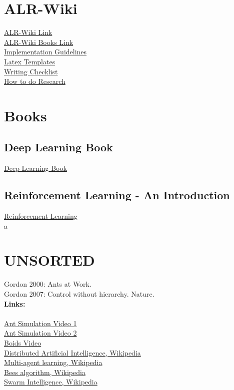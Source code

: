 \section{ALR-Wiki}
\href{https://www.notion.so/ALR-Student-Wiki-284ed2bb033f4ef494e2429ce0f51b6c}{ALR-Wiki Link}
\\
\href{https://www.notion.so/Books-e1b1a91cf80c426da3eddd9fec5bdd38}{ALR-Wiki Books Link}
\\
\href{https://www.notion.so/Implementation-Guidelines-0afdb8f58c714f42b3526eb415194c8c}{Implementation Guidelines}
\\
\href{https://www.notion.so/ebd32c68f9cd4502a02af10e82e410cd?v=0eab511a5007451baa2c199f0d6c7d35}{Latex Templates}
\\
\href{https://www.notion.so/Writing-Checklist-56979e6a0227447f8638d30bcbc33362}{Writing Checklist}
\\
\href{https://www.notion.so/Talks-How-to-research-e9b534f4dc09418e82cac8d8e2da4f4d}{How to do Research}

\section{Books}
\subsection{Deep Learning Book}
\href{https://www.deeplearningbook.org/}{Deep Learning Book}
\\


\subsection{Reinforcement Learning - An Introduction} 
\href{http://incompleteideas.net/book/the-book.html}{Reinforcement Learning}
\\
a

\section{UNSORTED}
Gordon 2000: Ants at Work.
\\
Gordon 2007: Control without hierarchy. Nature.
\\\textbf{Links:}\\
\\
\href{https://www.youtube.com/watch?v=X-iSQQgOd1A}{Ant Simulation Video 1}
\\
\href{https://www.youtube.com/watch?v=81GQNPJip2Y}{Ant Simulation Video 2}
\\
\href{https://www.youtube.com/watch?v=bqtqltqcQhw}{Boids Video}
\\
\href{https://en.wikipedia.org/wiki/Distributed_artificial_intelligence}{Distributed Artificial Intelligence, Wikipedia}
\\
\href{https://en.wikipedia.org/wiki/Multi-agent_learning}{Multi-agent learning, Wikipedia}
\\
\href{https://en.wikipedia.org/wiki/Bees_algorithm}{Bees algorithm, Wikipedia}
\\
\href{https://en.wikipedia.org/wiki/Swarm_intelligence}{Swarm Intelligence, Wikipedia}


